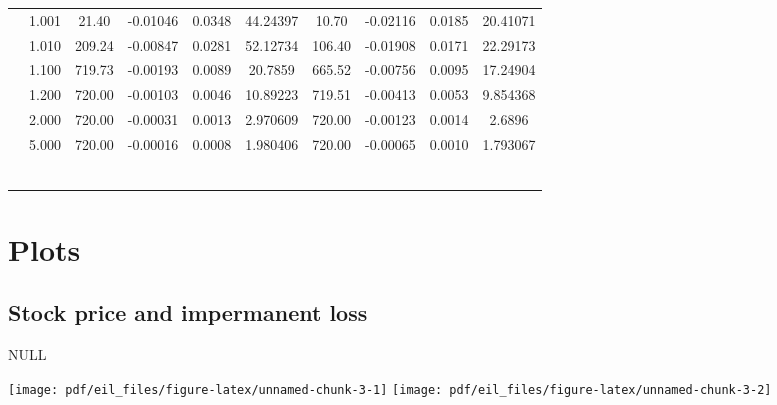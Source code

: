 \documentclass[
]{article}
\begin{document}
\begin{longtable}[t]{>{}cccccccccc}
\endfoot
\bottomrule
\endlastfoot
 & 1.001 & 21.40 & -0.01046 & 0.0348 & 44.24397 & 10.70 & -0.02116 & 0.0185 & 20.41071\\
\nopagebreak
 & 1.010 & 209.24 & -0.00847 & 0.0281 & 52.12734 & 106.40 & -0.01908 & 0.0171 & 22.29173\\
\nopagebreak
 & 1.100 & 719.73 & -0.00193 & 0.0089 & 20.7859 & 665.52 & -0.00756 & 0.0095 & 17.24904\\
\nopagebreak
 & 1.200 & 720.00 & -0.00103 & 0.0046 & 10.89223 & 719.51 & -0.00413 & 0.0053 & 9.854368\\
\nopagebreak
 & 2.000 & 720.00 & -0.00031 & 0.0013 & 2.970609 & 720.00 & -0.00123 & 0.0014 & 2.6896\\
\nopagebreak
\multirow{-6}{*}{\centering\arraybackslash 7.50e-05} & 5.000 & 720.00 & -0.00016 & 0.0008 & 1.980406 & 720.00 & -0.00065 & 0.0010 & 1.793067\\
\cmidrule{1-10}\pagebreak[0]
 &  &  &  &  &  &  &  &  \vphantom{5} & \\
\nopagebreak
 &  &  &  &  &  &  &  &  \vphantom{4} & \\
\nopagebreak
 &  &  &  &  &  &  &  &  \vphantom{3} & \\
\nopagebreak
 &  &  &  &  &  &  &  &  \vphantom{2} & \\
\nopagebreak
 &  &  &  &  &  &  &  &  \vphantom{1} & \\
\nopagebreak
\multirow{-6}{*}{\centering\arraybackslash } &  &  &  &  &  &  &  &  & \\*
\end{longtable}
\endgroup{}
\endgroup{}

\section{Plots} 
\label{plots}

\subsection{Stock price and impermanent loss}

NULL

\texttt{[image: pdf/eil\_files/figure-latex/unnamed-chunk-3-1]}
\texttt{[image: pdf/eil\_files/figure-latex/unnamed-chunk-3-2]}
\end{document}
